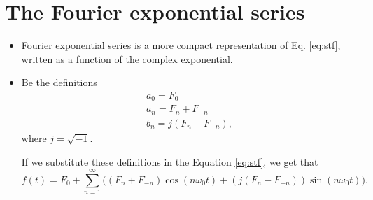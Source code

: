 \section{The Fourier exponential series}
\begin{itemize}
\item Fourier exponential series is a more compact representation of
  Eq. \ref{eq:stf}, written as a function of the complex exponential.
\item Be the definitions
\begin{equation}
\begin{array}{l}
  a_0 = F_0\\
  a_n = F_{n}+F_{-n}\\
  b_n = j(F_{n}-F_{-n}),
\end{array}
\tag{defs\_Fes}
\label{eq:defs_sef}
\end{equation}
where $j=\sqrt{-1}$.

If we substitute these definitions in the Equation \ref{eq:stf},
we get that
\begin{displaymath}
f(t) = F_0 + \sum_{n=1}^\infty \big((F_{n}+F_{-n}) \cos(n\omega_0t) +
   (j(F_{n}-F_{-n})) \sin(n\omega_0t)\big).
\end{displaymath}


\end{itemize}
